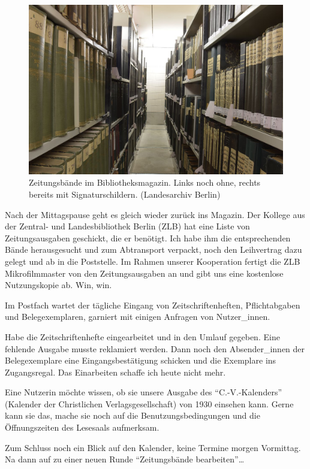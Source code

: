 \documentclass[a4paper,
fontsize=11pt,
oneside,
numbers=noperiodatend,
parskip=half-,
bibliography=totoc,
final
]{scrartcl}
\begin{document}
\begin{figure}
\centering
\includegraphics{img/Hallmann_1.jpg}
\caption{Zeitungsbände im Bibliotheksmagazin. Links noch ohne, rechts
bereits mit Signaturschildern. (Landesarchiv Berlin)}
\end{figure}

Nach der Mittagspause geht es gleich wieder zurück ins Magazin. Der
Kollege aus der Zentral- und Landesbibliothek Berlin (ZLB) hat eine
Liste von Zeitungsausgaben geschickt, die er benötigt. Ich habe ihm die
entsprechenden Bände herausgesucht und zum Abtransport verpackt, noch
den Leihvertrag dazu gelegt und ab in die Poststelle. Im Rahmen unserer
Kooperation fertigt die ZLB Mikrofilmmaster von den Zeitungsausgaben an
und gibt uns eine kostenlose Nutzungskopie ab. Win, win.

Im Postfach wartet der tägliche Eingang von Zeitschriftenheften,
Pflichtabgaben und Belegexemplaren, garniert mit einigen Anfragen von
Nutzer\_innen.

Habe die Zeitschriftenhefte eingearbeitet und in den Umlauf gegeben.
Eine fehlende Ausgabe musste reklamiert werden. Dann noch den
Absender\_innen der Belegexemplare eine Eingangsbestätigung schicken und
die Exemplare ins Zugangsregal. Das Einarbeiten schaffe ich heute nicht
mehr.

Eine Nutzerin möchte wissen, ob sie unsere Ausgabe des
\enquote{C.-V.-Kalenders} (Kalender der Christlichen
Verlagsgesellschaft) von 1930 einsehen kann. Gerne kann sie das, mache
sie noch auf die Benutzungsbedingungen und die Öffnungszeiten des
Lesesaals aufmerksam.

Zum Schluss noch ein Blick auf den Kalender, keine Termine morgen
Vormittag. Na dann auf zu einer neuen Runde \enquote{Zeitungsbände
bearbeiten}\ldots{}
\end{document}
